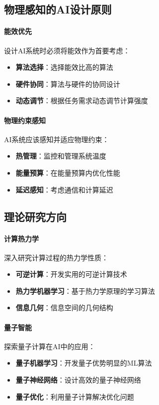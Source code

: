 \subsection{物理感知的AI设计原则}

\paragraph{能效优先}
设计AI系统时必须将能效作为首要考虑：
\begin{itemize}
\item \textbf{算法选择}：选择能效比高的算法
\item \textbf{硬件协同}：算法与硬件的协同设计
\item \textbf{动态调节}：根据任务需求动态调节计算强度
\end{itemize}

\paragraph{物理约束感知}
AI系统应该感知并适应物理约束：
\begin{itemize}
\item \textbf{热管理}：监控和管理系统温度
\item \textbf{能量预算}：在能量预算内优化性能
\item \textbf{延迟感知}：考虑通信和计算延迟
\end{itemize}

\subsection{理论研究方向}

\paragraph{计算热力学}
深入研究计算过程的热力学性质：
\begin{itemize}
\item \textbf{可逆计算}：开发实用的可逆计算技术
\item \textbf{热力学机器学习}：基于热力学原理的学习算法
\item \textbf{信息几何}：信息空间的几何结构
\end{itemize}

\paragraph{量子智能}
探索量子计算在AI中的应用：
\begin{itemize}
\item \textbf{量子机器学习}：开发量子优势明显的ML算法
\item \textbf{量子神经网络}：设计高效的量子神经网络
\item \textbf{量子优化}：利用量子计算解决优化问题
\end{itemize}

